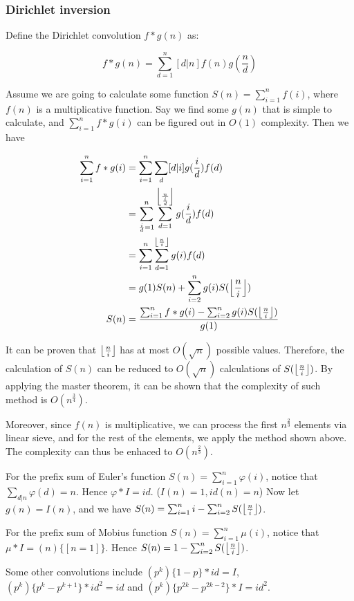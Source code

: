 \subsubsection{Dirichlet inversion}
Define the Dirichlet convolution $f*g(n)$ as:

$$f*g(n)=\sum^n_{d=1}[d|n]f(n)g(\frac{n}{d})$$

Assume we are going to calculate some function $S(n)=\sum^n_{i=1}f(i)$,
where $f(n)$ is a multiplicative function.
Say we find some $g(n)$ that is simple to calculate,
and $\sum^n_{i=1}f*g(i)$ can be figured out in $O(1)$ complexity.
Then we have

\begin{equation*}
\begin{split}
\sum^n_{i=1}f*g(i)	&=\sum^n_{i=1}\sum_d[d|i]g(\frac{i}{d})f(d)\\
					&=\sum^n_{\frac{i}{d}=1}\sum^{\floor*{\frac{n}{\frac{i}{d}}}}_{d=1}g(\frac{i}{d})f(d)\\
					&=\sum^n_{i=1}\sum^{\floor*{\frac{n}{i}}}_{d=1}g(i)f(d)\\
					&=g(1)S(n)+\sum^n_{i=2}g(i)S(\floor*{\frac{n}{i}})\\
S(n)				&=\frac{\sum^n_{i=1}f*g(i)-\sum^n_{i=2}g(i)S(\floor*{\frac{n}{i}})}{g(1)}\\
\end{split}
\end{equation*}


It can be proven that $\floor*{\frac{n}{i}}$ has at most $O(\sqrt{n})$ possible values.
Therefore, the calculation of $S(n)$ can be reduced to $O(\sqrt{n})$ calculations of $S(\floor*{\frac{n}{i}})$.
By applying the master theorem, it can be shown that the complexity of such method is $O(n^{\frac{3}{4}})$.

Moreover, since $f(n)$ is multiplicative, we can process the first $n^{\frac{2}{3}}$ elements via linear sieve,
and for the rest of the elements, we apply the method shown above. The complexity can thus be enhaced to $O(n^{\frac{2}{3}})$.

For the prefix sum of Euler's function $S(n)=\sum^n_{i=1}\varphi(i)$, notice that $\sum_{d|n}\varphi(d)=n$.
Hence $\varphi*I=id$. ($I(n)=1,id(n)=n$)
Now let $g(n)=I(n)$, and we have $S(n)=\sum^n_{i=1}i-\sum^n_{i=2}S(\floor*{\frac{n}{i}})$.

For the prefix sum of Mobius function $S(n)=\sum^n_{i=1}\mu(i)$, notice that $\mu*I=(n)\{[n=1]\}$.
Hence $S(n)=1-\sum^n_{i=2}S(\floor*{\frac{n}{i}})$.

Some other convolutions include $(p^k)\{1-p\}*id=I$, $(p^k)\{p^k-p^{k+1}\}*id^2=id$ and $(p^k)\{p^{2k}-p^{2k-2}\}*I=id^2$.

